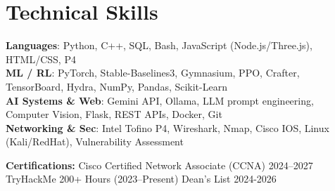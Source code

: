 \documentclass[letterpaper,10pt]{article}
\begin{document}
\section{Technical Skills}
 \begin{itemize}[leftmargin=0.15in, label={}]
    \small{\item{
     \textbf{Languages}{: Python, C++, SQL, Bash, JavaScript (Node.js/Three.js), HTML/CSS, P4} \\
     \textbf{ML / RL}{: PyTorch, Stable-Baselines3, Gymnasium, PPO, Crafter, TensorBoard, Hydra, NumPy, Pandas, Scikit-Learn} \\
     \textbf{AI Systems \& Web}{: Gemini API, Ollama, LLM prompt engineering, Computer Vision, Flask, REST APIs, Docker, Git} \\
     \textbf{Networking \& Sec}{: Intel Tofino P4, Wireshark, Nmap, Cisco IOS, Linux (Kali/RedHat), Vulnerability Assessment}
    }}
 \end{itemize}

\vspace{-6pt}
\begin{center}
\small \textbf{Certifications:} Cisco Certified Network Associate (CCNA) 2024--2027 \quad \textbullet \quad TryHackMe 200+ Hours (2023--Present) \quad \textbullet \quad Dean's List 2024-2026
\end{center}
\end{document}

